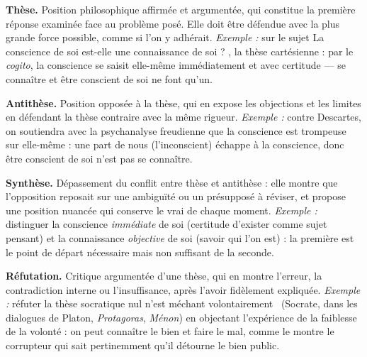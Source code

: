 \documentclass[11pt]{article}
\begin{document}
\begin{corrige}
\textbf{Thèse.} Position philosophique affirmée et argumentée, qui constitue la première réponse examinée face au problème posé. Elle doit être défendue avec la plus grande force possible, comme si l'on y adhérait. \emph{Exemple :} sur le sujet \guillemotleft La conscience de soi est-elle une connaissance de soi ? \guillemotright, la thèse cartésienne : par le \emph{cogito}, la conscience se saisit elle-même immédiatement et avec certitude --- se connaître et être conscient de soi ne font qu'un.

\textbf{Antithèse.} Position opposée à la thèse, qui en expose les objections et les limites en défendant la thèse contraire avec la même rigueur. \emph{Exemple :} contre Descartes, on soutiendra avec la psychanalyse freudienne que la conscience est trompeuse sur elle-même : une part de nous (l'inconscient) échappe à la conscience, donc être conscient de soi n'est pas se connaître.

\textbf{Synthèse.} Dépassement du conflit entre thèse et antithèse : elle montre que l'opposition reposait sur une ambiguïté ou un présupposé à réviser, et propose une position nuancée qui conserve le vrai de chaque moment. \emph{Exemple :} distinguer la conscience \emph{immédiate} de soi (certitude d'exister comme sujet pensant) et la connaissance \emph{objective} de soi (savoir qui l'on est) : la première est le point de départ nécessaire mais non suffisant de la seconde.

\textbf{Réfutation.} Critique argumentée d'une thèse, qui en montre l'erreur, la contradiction interne ou l'insuffisance, après l'avoir fidèlement expliquée. \emph{Exemple :} réfuter la thèse socratique \guillemotleft nul n'est méchant volontairement \guillemotright\ (Socrate, dans les dialogues de Platon, \emph{Protagoras}, \emph{Ménon}) en objectant l'expérience de la faiblesse de la volonté : on peut connaître le bien et faire le mal, comme le montre le corrupteur qui sait pertinemment qu'il détourne le bien public.
\end{corrige}
\end{document}
